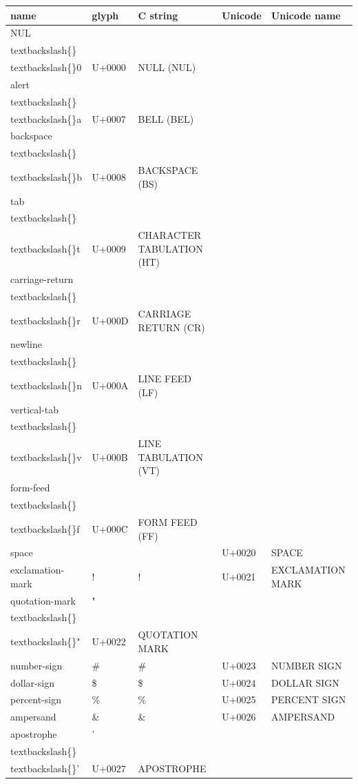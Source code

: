 \documentclass{article}
\begin{document}
\begin{tabular}{lllll}
\toprule
name & glyph & C string & Unicode & Unicode name \\
\midrule
NUL &  & \\textbackslash\{\}\\textbackslash\{\}0 & U+0000 & NULL (NUL) \\
alert &  & \\textbackslash\{\}\\textbackslash\{\}a & U+0007 & BELL (BEL) \\
backspace &  & \\textbackslash\{\}\\textbackslash\{\}b & U+0008 & BACKSPACE (BS) \\
tab &  & \\textbackslash\{\}\\textbackslash\{\}t & U+0009 & CHARACTER TABULATION (HT) \\
carriage-return &  & \\textbackslash\{\}\\textbackslash\{\}r & U+000D & CARRIAGE RETURN (CR) \\
newline &  & \\textbackslash\{\}\\textbackslash\{\}n & U+000A & LINE FEED (LF) \\
vertical-tab &  & \\textbackslash\{\}\\textbackslash\{\}v & U+000B & LINE TABULATION (VT) \\
form-feed &  & \\textbackslash\{\}\\textbackslash\{\}f & U+000C & FORM FEED (FF) \\
space &  &  & U+0020 & SPACE \\
exclamation-mark & ! & ! & U+0021 & EXCLAMATION MARK \\
quotation-mark & " & \\textbackslash\{\}\\textbackslash\{\}" & U+0022 & QUOTATION MARK \\
number-sign & \# & \# & U+0023 & NUMBER SIGN \\
dollar-sign & \$ & \$ & U+0024 & DOLLAR SIGN \\
percent-sign & \% & \% & U+0025 & PERCENT SIGN \\
ampersand & \& & \& & U+0026 & AMPERSAND \\
apostrophe & ' & \\textbackslash\{\}\\textbackslash\{\}' & U+0027 & APOSTROPHE \\

\end{tabular}
\end{document}
